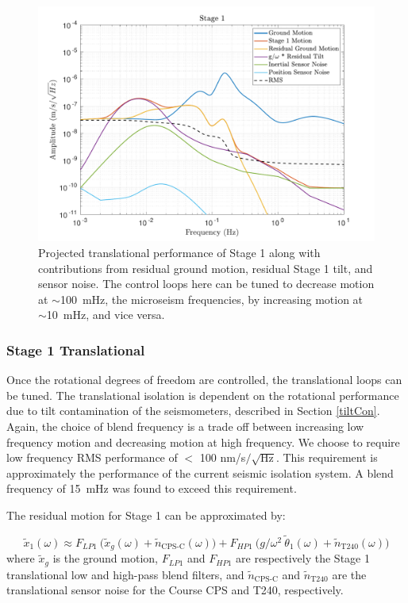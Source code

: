 \documentclass [12pt, proquest]{uwthesis}[2019]
\begin{document}
\begin{figure}[!h]
\begin{center}
\includegraphics[width=\textwidth]{cBRS_Model_ST1X.pdf}
\caption[Projected translational performance of Stage 1]{Projected translational performance of Stage 1 along with contributions from residual ground motion, residual Stage 1 tilt, and sensor noise.  The control loops here can be tuned to decrease motion at $\sim$100~mHz, the microseism frequencies, by increasing motion at $\sim$10~mHz, and vice versa.}
\label{cBRS1X}
\end{center}
\end{figure}

\subsubsection{Stage 1 Translational}

Once the rotational degrees of freedom are controlled, the translational loops can be tuned. The translational isolation is dependent on the rotational performance due to tilt contamination of the seismometers, described in Section \ref{tiltCon}. Again, the choice of blend frequency is a trade off between increasing low frequency motion and decreasing motion at high frequency. We choose to require low frequency RMS performance of $<$ 100 nm/s$/\sqrt{\text{Hz}}$. This requirement is approximately the performance of the current seismic isolation system. A blend frequency of 15~mHz was found to exceed this requirement. 


The residual motion for Stage 1 can be approximated by:

\begin{equation}
\tilde{x}_1(\omega)\approx F_{LP1}\ \big(\tilde{x}_g(\omega)+\tilde{n}_\text{CPS-C}(\omega)\big)+F_{HP1}\ \big( g/\omega^2\ \tilde{\theta}_1(\omega) +\tilde{n}_\text{T240}(\omega) \big)
\end{equation}
where $\tilde{x}_g$ is the ground motion, $F_{LP1}$ and $F_{HP1}$ are respectively the Stage 1 translational low and high-pass blend filters, and $\tilde{n}_\text{CPS-C}$ and $\tilde{n}_\text{T240}$ are the translational sensor noise for the Course CPS and T240, respectively.
\end{document}
